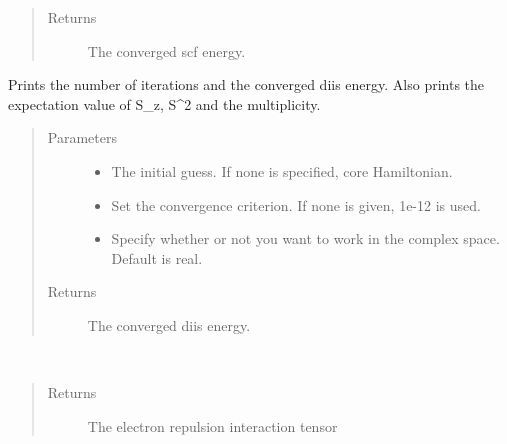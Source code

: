\documentclass[letterpaper,10pt,english]{sphinxmanual}
\begin{document}
\begin{fulllineitems}
\begin{fulllineitems}
\begin{quote}
\begin{description}
\item[{Returns}] \leavevmode
The converged scf energy.

\end{description}\end{quote}

\end{fulllineitems}


\begin{fulllineitems}
\label{\detokenize{UHF:ghf.UHF.UHF.get_scf_solution_diis}}
Prints the number of iterations and the converged diis energy.
Also prints the expectation value of S\_z, S\textasciicircum{}2 and the multiplicity.
\begin{quote}\begin{description}
\item[{Parameters}] \leavevmode\begin{itemize}
\item {} 
 \textendash{} The initial guess. If none is specified, core Hamiltonian.

\item {} 
 \textendash{} Set the convergence criterion. If none is given, 1e-12 is used.

\item {} 
 \textendash{} Specify whether or not you want to work in the complex space. Default is real.

\end{itemize}

\item[{Returns}] \leavevmode
The converged diis energy.

\end{description}\end{quote}

\end{fulllineitems}


\begin{fulllineitems}
\label{\detokenize{UHF:ghf.UHF.UHF.get_two_e}}~\begin{quote}\begin{description}
\item[{Returns}] \leavevmode
The electron repulsion interaction tensor


\end{description}
\end{quote}
\end{fulllineitems}
\end{fulllineitems}
\end{document}
